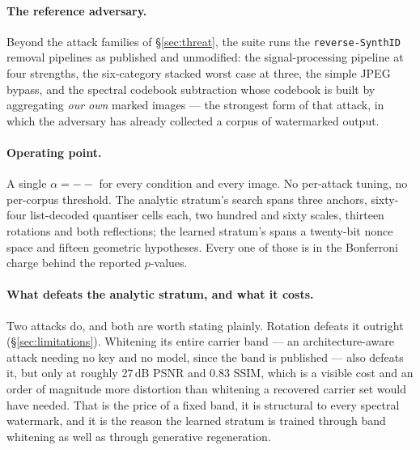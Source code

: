 \documentclass[10pt,twocolumn]{article}
\theoremstyle{definition}
\theoremstyle{remark}
\providecommand{\sigilAlpha}{--}
\begin{document}
\paragraph{The reference adversary.} Beyond the attack families of
\S\ref{sec:threat}, the suite runs the \texttt{reverse-SynthID} removal
pipelines as published and unmodified: the signal-processing pipeline at four
strengths, the six-category stacked worst case at three, the simple JPEG
bypass, and the spectral codebook subtraction whose codebook is built by
aggregating \emph{our own} marked images --- the strongest form of that attack,
in which the adversary has already collected a corpus of watermarked output.

\paragraph{Operating point.} A single $\alpha=\sigilAlpha$ for every condition and
every image. No per-attack tuning, no per-corpus threshold. The analytic
stratum's search spans three anchors, sixty-four list-decoded quantiser cells
each, two hundred and sixty scales, thirteen rotations and both reflections;
the learned stratum's spans a twenty-bit nonce space and fifteen geometric
hypotheses. Every one of those is in the Bonferroni charge behind the reported
$p$-values.

\paragraph{What defeats the analytic stratum, and what it costs.} Two attacks
do, and both are worth stating plainly. Rotation defeats it outright
(\S\ref{sec:limitations}). Whitening its entire carrier band --- an
architecture-aware attack needing no key and no model, since the band is
published --- also defeats it, but only at roughly 27\,dB PSNR and 0.83 SSIM,
which is a visible cost and an order of magnitude more distortion than
whitening a recovered carrier set would have needed. That is the price of a
fixed band, it is structural to every spectral watermark, and it is the reason
the learned stratum is trained through band whitening as well as through
generative regeneration.

\begin{table}[t]
\centering\small
\caption{Headline. One operating point, three conditions. The wrong-key row is
the strict control: the same image, marked under a key the detector does not
hold.}
\label{tab:headline}
\end{table}
\end{document}
